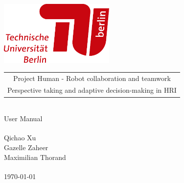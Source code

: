 \documentclass[12pt, a4paper, headinclude, footinclude, plainfootsepline]{scrreprt}
\begin{document}
\pagecolor{darkblue}

\hspace*{2cm}\includegraphics[width=57mm]{../Pictures/TULogo}

\begin{tabularx}{\textwidth}{C}
\\
\hline
\color{skyblue} Project Human - Robot collaboration and teamwork\\
\color{skyblue} Perspective taking and adaptive decision-making in HRI\\
\hline
\end{tabularx}
\vspace*{5cm}\\
\hspace*{3cm}\color{skyblue}\Huge User Manual
\\
\vspace*{0,7cm}\\
\hspace*{3cm}\small Qichao Xu
\vspace*{0,2cm}\\
\hspace*{3cm}\small Gazelle Zaheer
\vspace*{0,2cm}\\
\hspace*{3cm}\small Maximilian Thorand
\\
\vspace*{9cm}\\
\hspace*{14cm}\large \today 
\end{document}
